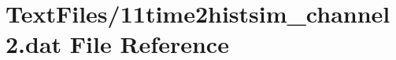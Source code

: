 \hypertarget{11time2histsim__channel2_8dat}{}\section{Text\+Files/11time2histsim\+\_\+channel2.dat File Reference}
\label{11time2histsim__channel2_8dat}
